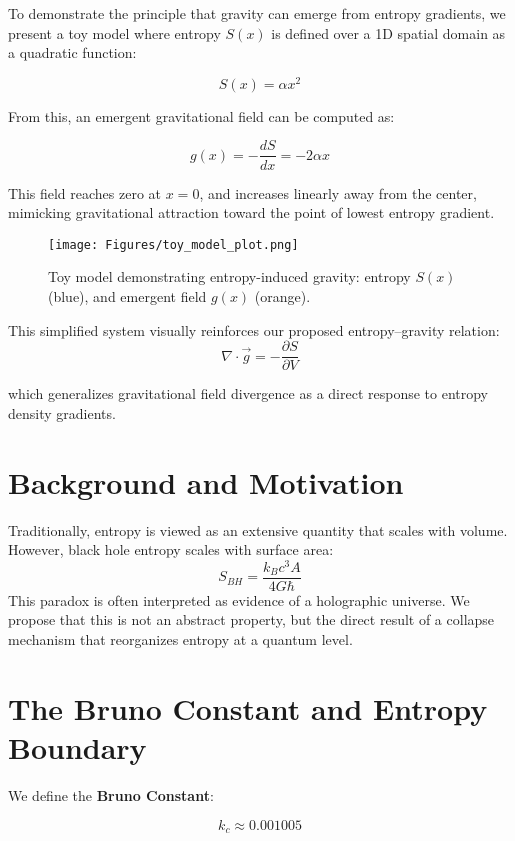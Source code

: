 \documentclass[12pt]{article}
\begin{document}
To demonstrate the principle that gravity can emerge from entropy gradients, we present a toy model where entropy \( S(x) \) is defined over a 1D spatial domain as a quadratic function:

\[
S(x) = \alpha x^2
\]

From this, an emergent gravitational field can be computed as:

\[
g(x) = -\frac{dS}{dx} = -2\alpha x
\]

This field reaches zero at \( x = 0 \), and increases linearly away from the center, mimicking gravitational attraction toward the point of lowest entropy gradient.

\begin{figure}[H]
    \centering
    \texttt{[image: Figures/toy\_model\_plot.png]}
    \caption{Toy model demonstrating entropy-induced gravity: entropy \ensuremath{S(x)} (blue), and emergent field \ensuremath{g(x)} (orange).}
    \label{fig:toy_model}
\end{figure}




This simplified system visually reinforces our proposed entropy–gravity relation:
\[
\nabla \cdot \vec{g} = -\frac{\partial S}{\partial V}
\]

which generalizes gravitational field divergence as a direct response to entropy density gradients.
\section{Background and Motivation}
Traditionally, entropy is viewed as an extensive quantity that scales with volume. However, black hole entropy scales with surface area:
\begin{equation}
S_{BH} = \frac{k_B c^3 A}{4 G \hbar}
\end{equation}
This paradox is often interpreted as evidence of a holographic universe. We propose that this is not an abstract property, but the direct result of a collapse mechanism that reorganizes entropy at a quantum level.

\section{The Bruno Constant and Entropy Boundary}

We define the \textbf{Bruno Constant}:

\begin{equation}
\boxed{k_c \approx 0.001005}
\end{equation}
\end{document}
